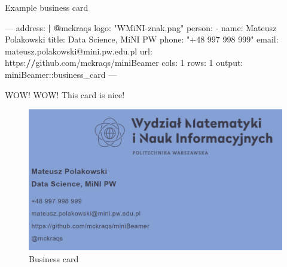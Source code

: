 \documentclass[ignorenonframetext,]{beamer}
\newenvironment{Shaded}{}{}
\newcommand{\DecValTok}[1]{#1}
\newcommand{\StringTok}[1]{\textcolor[rgb]{0.00,0.50,0.50}{#1}}
\newcommand{\OperatorTok}[1]{#1}
\newcommand{\ErrorTok}[1]{\textcolor[rgb]{1.00,0.00,0.00}{\textbf{#1}}}
\newcommand{\NormalTok}[1]{#1}
\begin{document}
\begin{frame}[fragile]{Example business card}

\scriptsize

\begin{Shaded}
\begin{Highlighting}[]
\OperatorTok{---}
\NormalTok{address}\OperatorTok{:}\StringTok{ }\ErrorTok{|}
\StringTok{  }\ErrorTok{@}\NormalTok{mckraqs}
\NormalTok{logo}\OperatorTok{:}\StringTok{ "WMiNI-znak.png"}
\NormalTok{person}\OperatorTok{:}
\StringTok{  }\OperatorTok{-}\StringTok{ }\NormalTok{name}\OperatorTok{:}\StringTok{ }\NormalTok{Mateusz Polakowski}
\NormalTok{    title}\OperatorTok{:}\StringTok{ }\NormalTok{Data Science, MiNI PW}
\NormalTok{    phone}\OperatorTok{:}\StringTok{ "+48 997 998 999"}
\NormalTok{    email}\OperatorTok{:}\StringTok{ }\NormalTok{mateusz.polakowski}\OperatorTok{@}\NormalTok{mini.pw.edu.pl}
\NormalTok{    url}\OperatorTok{:}\StringTok{ }\NormalTok{https}\OperatorTok{:}\ErrorTok{//}\NormalTok{github.com}\OperatorTok{/}\NormalTok{mckraqs}\OperatorTok{/}\NormalTok{miniBeamer}
\NormalTok{cols}\OperatorTok{:}\StringTok{ }\DecValTok{1}
\NormalTok{rows}\OperatorTok{:}\StringTok{ }\DecValTok{1}
\NormalTok{output}\OperatorTok{:}\StringTok{ }\NormalTok{miniBeamer}\OperatorTok{::}\NormalTok{business_card}
\OperatorTok{---}
\end{Highlighting}
\end{Shaded}

\end{frame}

\begin{frame}{WOW! WOW! This card is nice!}

\begin{figure}
\centering
\includegraphics{card.png}
\caption{Business card}
\end{figure}

\end{frame}
\end{document}
